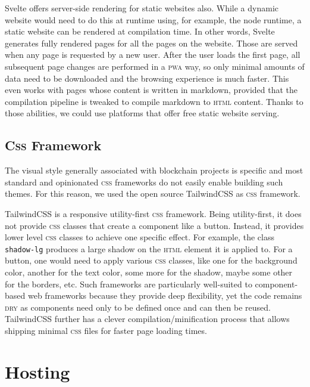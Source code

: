 Svelte offers server-side rendering for static websites also.
While a dynamic website would need to do this at runtime using, for example, the node runtime, a static website can be rendered at compilation time.
In other words, Svelte generates fully rendered pages for all the pages on the website.
Those are served when any page is requested by a new user.
After the user loads the first page, all subsequent page changes are performed in a \textsc{pwa} way, so only minimal amounts of data need to be downloaded and the browsing experience is much faster.
This even works with pages whose content is written in markdown, provided that the compilation pipeline is tweaked to compile markdown to \textsc{html} content.
Thanks to those abilities, we could use platforms that offer free static website serving.

\subsection{\textsc{Css} Framework}

\leavevmode\marginElement{}%
The visual style generally associated with blockchain projects is specific and most standard and opinionated \textsc{css} frameworks do not easily enable building such themes.
For this reason, we used the open source TailwindCSS as \textsc{css} framework.

TailwindCSS is a responsive utility-first \textsc{css} framework.
Being utility-first, it does not provide \textsc{css} classes that create a component like a button.
Instead, it provides lower level \textsc{css} classes to achieve one specific effect.
For example, the class \texttt{shadow-lg} produces a large shadow on the \textsc{html} element it is applied to.
For a button, one would need to apply various \textsc{css} classes, like one for the background color, another for the text color, some more for the shadow, maybe some other for the borders, etc.
Such frameworks are particularly well-suited to component-based web frameworks because they provide deep flexibility, yet the code remains \textsc{dry} as components need only to be defined once and can then be reused.
TailwindCSS further has a clever compilation/minification process that allows shipping minimal \textsc{css} files for faster page loading times.

\section{Hosting}
\label{sec:demo_hosting}

